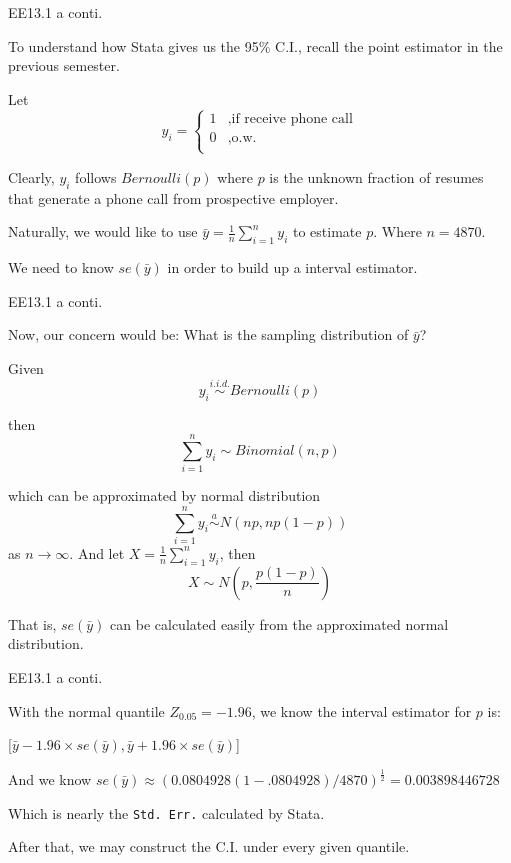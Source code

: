 %
\begin{frame}[fragile]{EE13.1 a conti.}

To understand how Stata gives us the 95\% C.I., recall the point estimator in the previous semester.

Let $$ y_i=\left\{
\begin{aligned}
1 & , \text{if receive phone call}\\
0 & , \text{o.w.}\\
\end{aligned}
\right.$$

Clearly, $y_i$ follows $Bernoulli(p)$ where $p$ is the unknown fraction of resumes that generate a phone call from prospective employer.

Naturally, we would like to use $\bar{y} = \frac{1}{n}\sum_{i=1}^n y_i$ to estimate $p$. Where $n=4870$.

We need to know $se(\bar{y})$ in order to build up a interval estimator.

\end{frame}


%
\begin{frame}[fragile]{EE13.1 a conti.}

Now, our concern would be: What is the sampling distribution of $\bar{y}$?

Given $$y_i \stackrel{i.i.d.}{\sim} Bernoulli(p)$$

then $$\sum_{i=1}^n y_i \sim Binomial(n, p)$$

which can be approximated by normal distribution $$\sum_{i=1}^n y_i \stackrel{a}{\sim} N(np, np(1-p))$$ as $n \rightarrow \infty$. And let $X = \frac{1}{n} \sum_{i=1}^n y_i$, then $$X \sim N(p, \frac{p(1-p)}{n})$$

That is, $se(\bar{y})$ can be calculated easily from the approximated normal distribution.
\end{frame}


%
\begin{frame}[fragile]{EE13.1 a conti.}

With the normal quantile $Z_{0.05} = -1.96$, we know the interval estimator for $p$ is:


[$ \bar{y}-1.96\times se(\bar{y}), \bar{y}+1.96 \times se(\bar{y}) $]


And we know $se(\bar{y}) \approx (0.0804928(1-.0804928)/4870)^{\frac{1}{2}} = 0.003898446728$

Which is nearly the \texttt{Std. Err.} calculated by Stata.

After that, we may construct the C.I. under every given quantile.

\end{frame}


